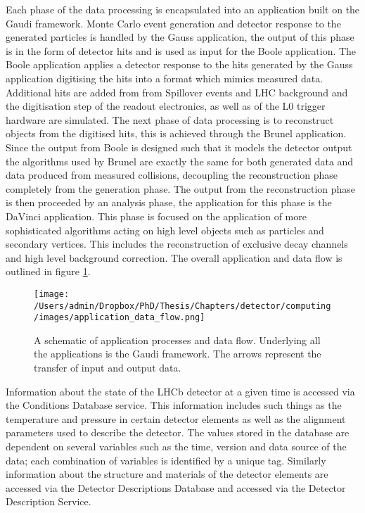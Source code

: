 Each phase of the data processing is encapsulated into an application built on the Gaudi framework. Monte Carlo event generation and detector response to the generated particles is handled by the Gauss application, the output of this phase is in the form of detector hits and is used as input for the Boole application. The Boole application applies a detector response to the hits generated by the Gauss application digitising the hits into a format which mimics measured data. Additional hits are added from from Spillover events and LHC background and the digitisation step of the readout electronics, as well as of the L0 trigger hardware are simulated. The next phase of data processing is to reconstruct objects from the digitised hits, this is achieved through the Brunel application. Since the output from Boole is designed such that it models the detector output the algorithms used by Brunel are exactly the same for both generated data and data produced from measured collisions, decoupling the reconstruction phase completely from the generation phase. The output from the reconstruction phase is then proceeded by an analysis phase, the application for this phase is the DaVinci application. This phase is focused on the application of more sophisticated algorithms acting on high level objects such as particles and secondary vertices. This includes the reconstruction of exclusive decay channels and high level background correction. The overall application and data flow is outlined in figure \ref{fig: application data flow}.

\begin{figure}[h]
	\texttt{[image: /Users/admin/Dropbox/PhD/Thesis/Chapters/detector/computing/images/application\_data\_flow.png]}
	\caption{A schematic of application processes and data flow. Underlying all the applications is the Gaudi framework. The arrows represent the transfer of input and output data.}
	\label{fig: application data flow}
\end{figure}


Information about the state of the LHCb detector at a given time is accessed via the Conditions Database service. This information includes such things as the temperature and pressure in certain detector elements as well as the alignment parameters used to describe the detector. The values stored in the database are dependent on several variables such as the time, version and data source of the data; each combination of variables is identified by a unique tag. Similarly information about the structure and materials of the detector elements are accessed via the Detector Descriptions Database and accessed via the Detector Description Service.

